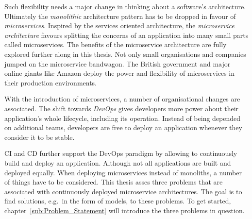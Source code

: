 Such flexibility needs a major change in thinking about a software's
architecture. Ultimately the \textit{monolithic} architecture pattern has to be
dropped in favour of \textit{microservices}. Inspired by the services oriented
architecture, the \textit{microservice architecture} favours splitting the
concerns of an application into many small parts called microservices. The
benefits of the microservice architecture are fully explored further along in
this thesis. Not only small organisations and companies jumped on the
microservice bandwagon. The British government
\autocite{LoweLeadingwaymicroservices2016} and major online giants like Amazon
\autocite{JenkinsVelocityCulture2011} deploy the power and flexibility of
microservices in their production environments.

With the introduction of microservices, a number of organisational changes are
associated. The shift towards \textit{DevOps} gives developers more power about
their application's whole lifecycle, including its operation. Instead of being
depended on additional teams, developers are free to deploy an application
whenever they consider it to be stable.

\acf{CI} and \acf{CD} further support the DevOps paradigm by allowing to
continuously build and deploy an application. Although not all applications are
built and deployed equally. When deploying microservices instead of monoliths,
a number of things have to be considered. This thesis asses  three problems that are associated with continuously
deployed microservice architectures. The goal is to find solutions, e.g.\ in
the form of models, to these problems. To get started,
chapter~\ref{sub:Problem_Statement} will introduce the three problems in question.
